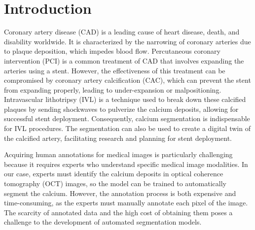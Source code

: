 \documentclass[a4paper,11pt,oneside]{report}
\begin{document}
\maketoc

\chapter{Introduction}


Coronary artery disease (CAD) is a leading cause of heart disease, death, and disability worldwide. It is characterized by the narrowing of coronary arteries due to plaque deposition, which impedes blood flow. Percutaneous coronary intervention (PCI) is a common treatment of CAD that involves expanding the arteries using a stent. However, the effectiveness of this treatment can be compromised by coronary artery calcification (CAC), which can prevent the stent from expanding properly, leading to under-expansion or malpositioning. Intravascular lithotripsy (IVL) is a technique used to break down these calcified plaques by sending shockwaves to pulverize the calcium deposits, allowing for successful stent deployment. Consequently, calcium segmentation is indispensable for IVL procedures. The segmentation can also be used to create a digital twin of the calcified artery, facilitating research and planning for stent deployment.


Acquiring human annotations for medical images is particularly challenging because it requires experts who understand specific medical image modalities. In our case, experts must identify the calcium deposits in optical coherence tomography (OCT) images, so the model can be trained to automatically segment the calcium. However, the annotation process is both expensive and time-consuming, as the experts must manually annotate each pixel of the image. The scarcity of annotated data and the high cost of obtaining them poses a challenge to the development of automated segmentation models.  %
\end{document}
